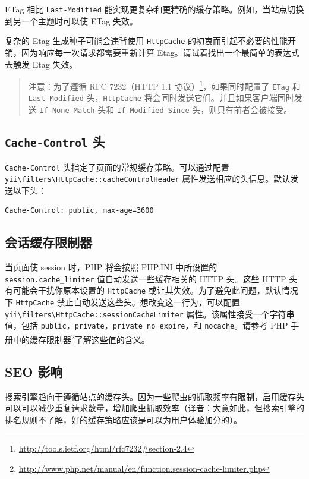 ETag 相比 \lstinline|Last-Modified| 能实现更复杂和更精确的缓存策略。例如，当站点切换到另一个主题时可以使 ETag 失效。

复杂的 Etag 生成种子可能会违背使用 \lstinline|HttpCache| 的初衷而引起不必要的性能开销，因为响应每一次请求都需要重新计算 Etag。请试着找出一个最简单的表达式去触发 Etag 失效。

\begin{quote}注意：为了遵循 RFC 7232（HTTP 1.1 协议）\footnote{\url{http://tools.ietf.org/html/rfc7232\#section-2.4}}，如果同时配置了 \lstinline|ETag| 和 \lstinline|Last-Modified| 头，\lstinline|HttpCache| 将会同时发送它们。并且如果客户端同时发送 \lstinline|If-None-Match| 头和 \lstinline|If-Modified-Since| 头，则只有前者会被接受。

\end{quote}
\subsection{\lstinline|Cache-Control| 头 \label{caching-http.md::cache-control}}
\lstinline|Cache-Control| 头指定了页面的常规缓存策略。可以通过配置 \texttt{yii{\allowbreak{}\textbackslash}filters{\allowbreak{}\textbackslash}HttpCache\allowbreak{}::\allowbreak{}cacheControlHeader} 属性发送相应的头信息。默认发送以下头：

\begin{lstlisting}
Cache-Control: public, max-age=3600
\end{lstlisting}
\subsection{会话缓存限制器 \label{caching-http.md::session-cache-limiter}}
当页面使 session 时，PHP 将会按照 PHP.INI 中所设置的 \lstinline|session.cache_limiter| 值自动发送一些缓存相关的 HTTP 头。这些 HTTP 头有可能会干扰你原本设置的 \lstinline|HttpCache| 或让其失效。为了避免此问题，默认情况下 \lstinline|HttpCache| 禁止自动发送这些头。想改变这一行为，可以配置 \texttt{yii{\allowbreak{}\textbackslash}filters{\allowbreak{}\textbackslash}HttpCache\allowbreak{}::\allowbreak{}sessionCacheLimiter} 属性。该属性接受一个字符串值，包括 \lstinline|public|，\lstinline|private|，\lstinline|private_no_expire|，和 \lstinline|nocache|。请参考 PHP 手册中的缓存限制器\footnote{\url{http://www.php.net/manual/en/function.session-cache-limiter.php}}了解这些值的含义。

\subsection{SEO 影响 \label{caching-http.md::seo-implications}}
搜索引擎趋向于遵循站点的缓存头。因为一些爬虫的抓取频率有限制，启用缓存头可以可以减少重复请求数量，增加爬虫抓取效率（译者：大意如此，但搜索引擎的排名规则不了解，好的缓存策略应该是可以为用户体验加分的）。



